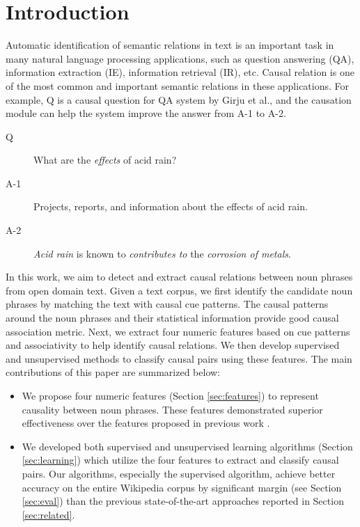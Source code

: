 \section{Introduction}
\label{sec:intro}

Automatic identification of semantic relations in text is an
important task in many natural language processing applications,
such as question answering (QA), information extraction (IE),
information retrieval (IR), etc.
Causal relation is one of the most common and important semantic relations
in these applications. For example, Q is a causal question for
QA system by Girju et al.\cite{girju2003automatic},
and the causation module can help the system
improve the answer from A-1 to A-2.
\begin{description}
\item[Q] What are the \emph{effects} of acid rain?
\item[A-1] Projects, reports, and information about the effects of acid rain.
\item[A-2] \emph{Acid rain} is known to \emph{contributes to} the \emph{corrosion of metals}.
\end{description}

In this work, we aim to detect and extract causal relations
between noun phrases from open domain text. Given a text corpus,
we first identify the candidate noun phrases by matching the text with
causal cue patterns\cite{GirjuM02}. The causal patterns around
the noun phrases and their statistical information provide good causal
association metric. Next, we extract four numeric features based on
cue patterns and associativity to help identify causal relations.
We then develop supervised and unsupervised methods to classify causal pairs
using these features. The main contributions of this paper are summarized
below:
\begin{itemize}
\item We propose four numeric features (Section \ref{sec:features})
to represent causality between noun
phrases. These features demonstrated superior effectiveness over
the features proposed in previous work
\cite{girju2003automatic,chang2006incremental}.
\item We developed both supervised and unsupervised learning algorithms (Section
\ref{sec:learning}) which utilize the four features to extract and classify
causal pairs. Our algorithms, especially the supervised algorithm,
achieve better accuracy on the entire Wikipedia corpus
by significant margin (see Section \ref{sec:eval})
than the previous state-of-the-art approaches
reported in Section \ref{sec:related}.
\end{itemize}

